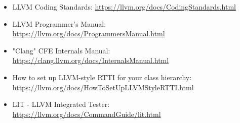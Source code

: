 \begin{itemize}
\item
LLVM Coding Standards: \url{https://llvm.org/docs/CodingStandards.html}

\item
LLVM Programmer's Manual: \url{https://llvm.org/docs/ProgrammersManual.html}

\item
"Clang" CFE Internals Manual: \url{https://clang.llvm.org/docs/InternalsManual.html}

\item
How to set up LLVM-style RTTI for your class hierarchy: \url{https://llvm.org/docs/HowToSetUpLLVMStyleRTTI.html}

\item
LIT - LLVM Integrated Tester: \url{https://llvm.org/docs/CommandGuide/lit.html}
\end{itemize}
